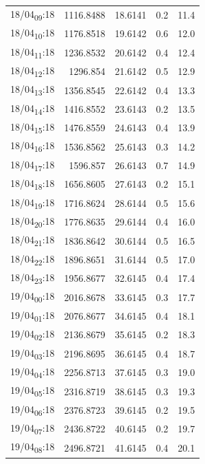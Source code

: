 \documentclass[11pt]{article}
\begin{document}
\begin{center}
\begin{tabular}{lrrrr}
18/04\textsubscript{09}:18 & 1116.8488 & 18.6141 & 0.2 & 11.4\\[0pt]
18/04\textsubscript{10}:18 & 1176.8518 & 19.6142 & 0.6 & 12.0\\[0pt]
18/04\textsubscript{11}:18 & 1236.8532 & 20.6142 & 0.4 & 12.4\\[0pt]
18/04\textsubscript{12}:18 & 1296.854 & 21.6142 & 0.5 & 12.9\\[0pt]
18/04\textsubscript{13}:18 & 1356.8545 & 22.6142 & 0.4 & 13.3\\[0pt]
18/04\textsubscript{14}:18 & 1416.8552 & 23.6143 & 0.2 & 13.5\\[0pt]
18/04\textsubscript{15}:18 & 1476.8559 & 24.6143 & 0.4 & 13.9\\[0pt]
18/04\textsubscript{16}:18 & 1536.8562 & 25.6143 & 0.3 & 14.2\\[0pt]
18/04\textsubscript{17}:18 & 1596.857 & 26.6143 & 0.7 & 14.9\\[0pt]
18/04\textsubscript{18}:18 & 1656.8605 & 27.6143 & 0.2 & 15.1\\[0pt]
18/04\textsubscript{19}:18 & 1716.8624 & 28.6144 & 0.5 & 15.6\\[0pt]
18/04\textsubscript{20}:18 & 1776.8635 & 29.6144 & 0.4 & 16.0\\[0pt]
18/04\textsubscript{21}:18 & 1836.8642 & 30.6144 & 0.5 & 16.5\\[0pt]
18/04\textsubscript{22}:18 & 1896.8651 & 31.6144 & 0.5 & 17.0\\[0pt]
18/04\textsubscript{23}:18 & 1956.8677 & 32.6145 & 0.4 & 17.4\\[0pt]
19/04\textsubscript{00}:18 & 2016.8678 & 33.6145 & 0.3 & 17.7\\[0pt]
19/04\textsubscript{01}:18 & 2076.8677 & 34.6145 & 0.4 & 18.1\\[0pt]
19/04\textsubscript{02}:18 & 2136.8679 & 35.6145 & 0.2 & 18.3\\[0pt]
19/04\textsubscript{03}:18 & 2196.8695 & 36.6145 & 0.4 & 18.7\\[0pt]
19/04\textsubscript{04}:18 & 2256.8713 & 37.6145 & 0.3 & 19.0\\[0pt]
19/04\textsubscript{05}:18 & 2316.8719 & 38.6145 & 0.3 & 19.3\\[0pt]
19/04\textsubscript{06}:18 & 2376.8723 & 39.6145 & 0.2 & 19.5\\[0pt]
19/04\textsubscript{07}:18 & 2436.8722 & 40.6145 & 0.2 & 19.7\\[0pt]
19/04\textsubscript{08}:18 & 2496.8721 & 41.6145 & 0.4 & 20.1\\[0pt]

\end{tabular}
\end{center}
\end{document}
